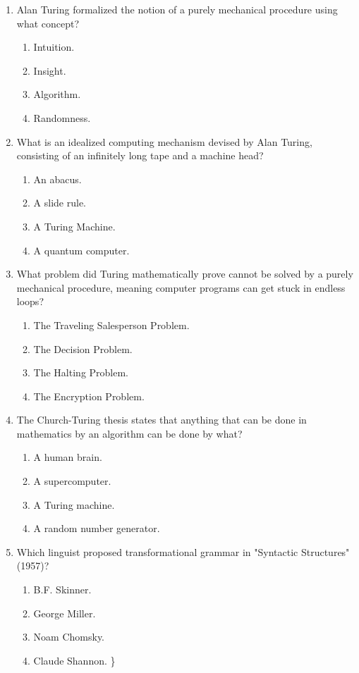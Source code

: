 \documentclass{article}
\begin{document}
\begin{enumerate}[label=\arabic*.]
\item Alan Turing formalized the notion of a purely mechanical procedure using what concept?
\begin{enumerate}[label=(\alph*)]
    \item Intuition.
    \item Insight.
    \item Algorithm.
    \item Randomness.
\end{enumerate}

\item What is an idealized computing mechanism devised by Alan Turing, consisting of an infinitely long tape and a machine head?
\begin{enumerate}[label=(\alph*)]
    \item An abacus.
    \item A slide rule.
    \item A Turing Machine.
    \item A quantum computer.
\end{enumerate}

\item What problem did Turing mathematically prove cannot be solved by a purely mechanical procedure, meaning computer programs can get stuck in endless loops?
\begin{enumerate}[label=(\alph*)]
    \item The Traveling Salesperson Problem.
    \item The Decision Problem.
    \item The Halting Problem.
    \item The Encryption Problem.
\end{enumerate}

\item The Church-Turing thesis states that anything that can be done in mathematics by an algorithm can be done by what?
\begin{enumerate}[label=(\alph*)]
    \item A human brain.
    \item A supercomputer.
    \item A Turing machine.
    \item A random number generator.
\end{enumerate}

\item Which linguist proposed transformational grammar in "Syntactic Structures" (1957)?
\begin{enumerate}[label=(\alph*)]
    \item B.F. Skinner.
    \item George Miller.
    \item Noam Chomsky.
    \item Claude Shannon.
\}\end{enumerate}


\end{enumerate}
\end{document}
